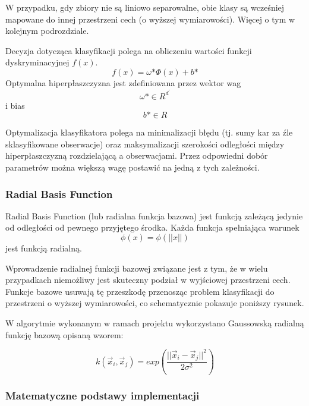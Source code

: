 \documentclass[[10pt,a4paper]{article}
\begin{document}
W przypadku, gdy zbiory nie są liniowo separowalne, obie klasy są wcześniej mapowane do innej przestrzeni cech (o wyższej wymiarowości). Więcej o tym w kolejnym podrozdziale.

Decyzja dotycząca klasyfikacji polega na obliczeniu wartości funkcji dyskryminacyjnej $f(x)$.
\begin{equation}
f(x) = \omega\text{*} \Phi(x) + b\text{*}
\end{equation}
Optymalna hiperpłaszczyzna jest zdefiniowana przez wektor wag
\begin{equation}
\omega\text{*} \in R^{d^\prime}
\end{equation}
i bias
\begin{equation}
b\text{*} \in R
\end{equation}

Optymalizacja klasyfikatora polega na minimalizacji błędu (tj. sumy kar za źle sklasyfikowane obserwacje) oraz maksymalizacji szerokości odległości między hiperpłaszczyzną rozdzielającą a obserwacjami. Przez odpowiedni dobór parametrów można większą wagę postawić na jedną z tych zależności.
\subsubsection{Radial Basis Function}
Radial Basis Function (lub radialna funkcja bazowa) jest funkcją zależącą jedynie od odległości od pewnego przyjętego środka. Każda funkcja spełniająca warunek
\begin{equation}
\phi(x) = \phi(||x||)
\end{equation}
jest funkcją radialną.

Wprowadzenie radialnej funkcji bazowej związane jest z tym, że w wielu przypadkach niemożliwy jest skuteczny podział w wyjściowej przestrzeni cech. Funkcje bazowe usuwają tę przeszkodę przenosząc problem klasyfikacji do przestrzeni o wyższej wymiarowości, co schematycznie pokazuje poniższy rysunek.

W algorytmie wykonanym w ramach projektu wykorzystano Gaussowską radialną funkcję bazową opisaną wzorem:

\begin{equation}
k(\vec{x}_i,\vec{x}_j) = exp(\frac{||\vec{x}_i-\vec{x}_j||^2}{2\sigma^2})
\end{equation}
\subsubsection{Matematyczne podstawy implementacji}
\end{document}
